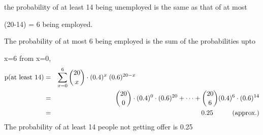 \documentclass{article}
\begin{document}
{    \hspace{1.5em}the probability of at least 14 being unemployed is the same as that of at most 

    \hspace{1.5em}(20-14) = 6 being employed.

    \hspace{1.5em}The probability of at most 6 being employed is the sum of the probabilities upto 

    \hspace{1.5em}x=6 from x=0,
    \begin{eqnarray*}
        \text{p(at least 14)} &=& \sum_{x=0}^6 {20 \choose x} \cdot (0.4)^x \; (0.6)^{20-x}\hspace{6.5cm}\\
        &=& {20 \choose 0} \cdot (0.4)^0\cdot(0.6)^{20} + \dots + {20 \choose 6} (0.4)^6\cdot (0.6)^{14}\\
        &=& 0.25\hspace{1cm}\text{(approx.)}
    \end{eqnarray*}
    \hspace{1.5em}The probability of at least 14 people not getting offer is 0.25

    
}
\end{document}
